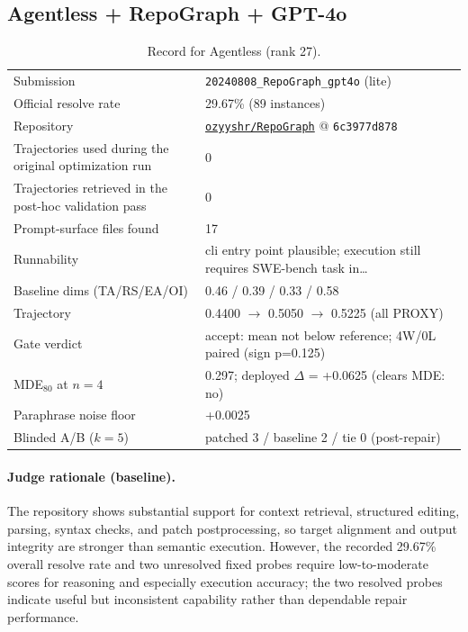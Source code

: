 \subsection{Agentless + RepoGraph + GPT-4o}
\label{app:agent27}
\begin{table}[H]\centering\scriptsize
\caption{Record for Agentless (rank 27).}
\begin{tabular}{lp{8.2cm}}\toprule
Submission & \texttt{20240808\_\allowbreak{}RepoGraph\_\allowbreak{}gpt4o} (lite) \\
Official resolve rate & 29.67\% (89 instances) \\
Repository & \href{https://github.com/ozyyshr/RepoGraph}{\texttt{ozyyshr/RepoGraph}} @ \texttt{6c3977d878} \\
Trajectories used during the original optimization run & 0 \\
Trajectories retrieved in the post-hoc validation pass & 0 \\
Prompt-surface files found & 17 \\
Runnability & cli entry point plausible; execution still requires SWE-bench task in\ldots{} \\
Baseline dims (TA/RS/EA/OI) & 0.46 / 0.39 / 0.33 / 0.58 \\
Trajectory & 0.4400 $\to$ 0.5050 $\to$ 0.5225 (all PROXY) \\
Gate verdict & accept: mean not below reference; 4W/0L paired (sign p=0.125) \\
MDE$_{80}$ at $n{=}4$ & 0.297; deployed $\Delta$ = +0.0625 (clears MDE: no) \\
Paraphrase noise floor & +0.0025 \\
Blinded A/B ($k{=}5$) & patched 3 / baseline 2 / tie 0 (post-repair) \\
\bottomrule\end{tabular}\end{table}
\paragraph{Judge rationale (baseline).}
The repository shows substantial support for context retrieval, structured editing, parsing, syntax checks, and patch postprocessing, so target alignment and output integrity are stronger than semantic execution. However, the recorded 29.67\% overall resolve rate and two unresolved fixed probes require low-to-moderate scores for reasoning and especially execution accuracy; the two resolved probes indicate useful but inconsistent capability rather than dependable repair performance.
